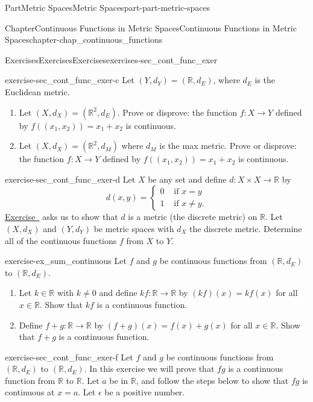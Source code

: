 \documentclass[oneside,10pt,]{book}
\newcommand{\xreffont}{\relax}
\numberwithin{equation}{chapter}
\newcommand{\R}{\mathbb{R}}
\newcommand{\amp}{&}
\begin{document}
\begin{partptx}{Part}{Metric Spaces}{}{Metric Spaces}{}{}{part-part-metric-spaces}
\begin{chapterptx}{Chapter}{Continuous Functions in Metric Spaces}{}{Continuous Functions in Metric Spaces}{}{}{chapter-chap_continuous_functions}
\begin{exercises-section}{Exercises}{Exercises}{}{Exercises}{}{}{exercises-sec_cont_func_exer}
\begin{divisionexercise}{3}{}{}{exercise-sec_cont_func_exer-c}
Let \((Y, d_Y) = (\R, d_E)\), where \(d_E\) is the Euclidean metric.%
\begin{enumerate}[font=\bfseries,label=(\alph*),ref=\alph*]%
\item{}Let \((X,d_X) = (\R^2, d_E)\). Prove or disprove: the function \(f:X \to Y\) defined by \(f((x_1,x_2)) = x_1 + x_2\) is continuous.%
\item{}Let \((X,d_X) = (\R^2, d_M)\) where \(d_M\) is the max metric. Prove or disprove: the function \(f:X \to Y\) defined by \(f((x_1,x_2)) = x_1 + x_2\) is continuous.%
\end{enumerate}%
\end{divisionexercise}%
\begin{divisionexercise}{4}{}{}{exercise-sec_cont_func_exer-d}%
Let \(X\) be any set and define \(d : X \times X \to \R\) by%
\begin{equation*}
d(x,y) = \begin{cases}0 \amp \text{ if }  x=y \\ 1 \amp \text{ if }  x \neq y. \end{cases}
\end{equation*}
\hyperlink{exercise-ex_MS_discrete}{Exercise~{\xreffont 1}} asks us to show that \(d\) is a metric (the discrete metric) on \(\R\). Let \((X,d_X)\) and \((Y, d_Y)\) be metric spaces with \(d_X\) the discrete metric. Determine all of the continuous functions \(f\) from \(X\) to \(Y\).%
\end{divisionexercise}%
\begin{divisionexercise}{5}{}{}{exercise-ex_sum_continuous}%
Let \(f\) and \(g\) be continuous functions from \((\R,d_E)\) to \((\R, d_E)\).%
\begin{enumerate}[font=\bfseries,label=(\alph*),ref=\alph*]%
\item{}Let \(k \in \R\) with \(k \neq 0\) and define \(kf : \R \to \R\) by \((kf)(x) = kf(x)\) for all \(x \in \R\). Show that \(kf\) is a continuous function.%
\item{}Define \(f+g : \R \to \R\) by \((f+g)(x) = f(x) + g(x)\) for all \(x \in \R\). Show that \(f+g\) is a continuous function.%
\end{enumerate}%
\end{divisionexercise}%
\begin{divisionexercise}{6}{}{}{exercise-sec_cont_func_exer-f}%
Let \(f\) and \(g\) be continuous functions from \((\R, d_E)\) to \((\R,d_E)\). In this exercise we will prove that \(fg\) is a continuous function from \(\R\) to \(\R\). Let \(a\) be in \(\R\), and follow the steps below to show that \(fg\) is continuous at \(x=a\). Let \(\epsilon\) be a positive number.%

\end{divisionexercise}
\end{exercises-section}
\end{chapterptx}
\end{partptx}
\end{document}
